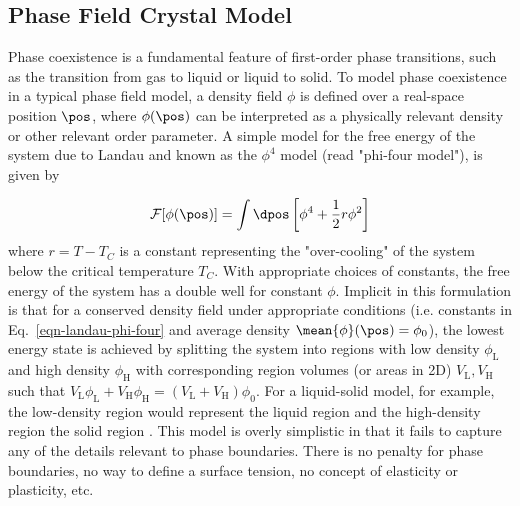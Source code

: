%
%
%
%
%

\subsection{Phase Field Crystal Model}

Phase coexistence is a fundamental feature of first-order phase transitions, such as the transition from gas to liquid or liquid to solid.  To model phase coexistence in a typical phase field model, a density field $\phi$ is defined over a real-space position $\pos$, where $\phi(\pos)$ can be interpreted as a physically relevant density or other relevant order parameter.  A simple model for the free energy of the system due to Landau and known as the $\phi^4$ model (read "phi-four model"), is given by

\begin{align}\label{eqn-landau-phi-four}
    \mathcal{F}[\phi(\pos)] = \int \dpos \left[ \phi^4 + \frac{1}{2} r \phi^2 \right]
\end{align}
%
where $r = T - T_C$ is a constant representing the "over-cooling" of the system below the critical temperature $T_C$.  With appropriate choices of constants, the free energy of the system has a double well for constant $\phi$.  Implicit in this formulation is that for a conserved density field under appropriate conditions (i.e. constants in Eq.~\ref{eqn-landau-phi-four} and average density $\mean{\phi}(\pos) = \phi_0$), the lowest energy state is achieved by splitting the system into regions with low density $\phi_\text{L}$ and high density $\phi_\text{H}$ with corresponding region volumes (or areas in 2D) $V_\text{L}, V_\text{H}$ such that $V_\text{L} \phi_\text{L} + V_\text{H} \phi_\text{H} = (V_\text{L} + V_\text{H}) \phi_0$.  For a liquid-solid model, for example, the low-density region would represent the liquid region and the high-density region the solid region \cite{chen2007phase}.  This model is overly simplistic in that it fails to capture any of the details relevant to phase boundaries.  There is no penalty for phase boundaries, no way to define a surface tension, no concept of elasticity or plasticity, etc.

